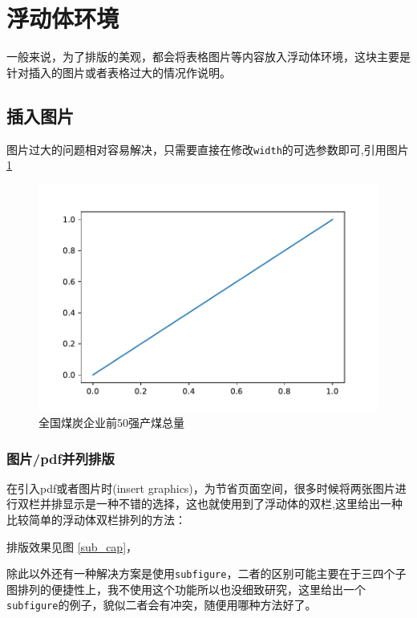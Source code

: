 \documentclass[withoutpreface,bwprint]{../cumcmthesis} %
\begin{document}
\section{浮动体环境}
一般来说，为了排版的美观，都会将表格图片等内容放入浮动体环境，这块主要是针对插入的图片或者表格过大的情况作说明。
\subsection{插入图片}
图片过大的问题相对容易解决，只需要直接在修改\verb|width|的可选参数即可,引用图片\ref{sum_production}
\begin{figure}[H]%
  \small
  \centering
  \includegraphics[width=\textwidth]{./asset/figure.pdf}
  \caption{全国煤炭企业前50强产煤总量}\label{sum_production}
\end{figure}
\subsubsection{图片/pdf并列排版}\label{双栏}
在引入pdf或者图片时(insert graphics)，为节省页面空间，很多时候将两张图片进行双栏并排显示是一种不错的选择，这也就使用到了浮动体的双栏,这里给出一种比较简单的浮动体双栏排列的方法：

排版效果见图 \ref{sub_cap}，
{
  
}

除此以外还有一种解决方案是使用\verb|subfigure|，二者的区别可能主要在于三四个子图排列的便捷性上，我不使用这个功能所以也没细致研究，这里给出一个\verb|subfigure|的例子，貌似二者会有冲突，随便用哪种方法好了。

\end{document}
